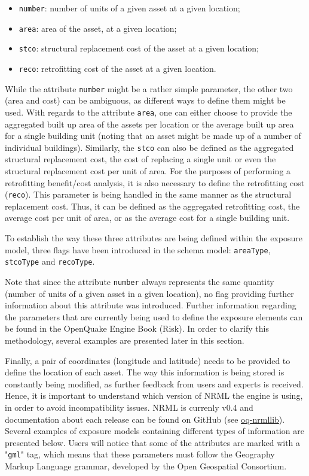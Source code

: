 \begin{itemize}
\item  \Verb+number+: number of units of a given \gls{asset} at a given location;
\item  \Verb+area+: area of the \gls{asset}, at a given location;
\item  \Verb+stco+: structural replacement cost of the \gls{asset} at a given location; 
\item  \Verb+reco+: retrofitting cost of the \gls{asset} at a given location. 
\end{itemize}

While the attribute \Verb+number+ might be a rather simple parameter, the other two (area and cost) can be ambiguous, as different ways to define them might be used. With regards to the attribute \Verb+area+, one can either choose to provide the aggregated built up area of the \glspl{asset} per location or the average built up area for a single building unit (noting that an \gls{asset} might be made up of a number of individual buildings). Similarly, the \Verb+stco+ can also be defined as the aggregated structural replacement cost, the cost of replacing a single unit or even the structural replacement cost per unit of area. For the purposes of performing a retrofitting benefit/cost analysis, it is also necessary to define the retrofitting cost (\Verb+reco+). This parameter is being handled in the same manner as the structural replacement cost. Thus, it can be defined as the aggregated retrofitting cost, the average cost per unit of area, or as the average cost for a single building unit. 

To establish the way these three attributes are being defined within the \gls{exposure model}, three flags have been introduced in the schema model:  \Verb+areaType+, \Verb+stcoType+ and \Verb+recoType+.

Note that since the attribute \Verb+number+ always represents the same quantity (number of units of a given \gls{asset} in a given location), no flag providing further information about this attribute was introduced. Further information regarding the parameters that are currently being used to define the exposure elements can be found in the OpenQuake Engine Book (Risk). In order to clarify this methodology, several examples are presented later in this section.

Finally, a pair of coordinates (longitude and latitude) needs to be provided to define the location of each asset. The way this information is being stored is constantly being modified, as further feedback from users and experts is received. Hence, it is important to understand which version of NRML the engine is using, in order to avoid incompatibility issues. NRML is currenly v0.4 and documentation about each release can be found on GitHub (see \href{http://gitub.com/gem/oq-nrmllib}{oq-nrmllib}). Several examples of \glspl{exposure model} containing different types of information are presented below. Users will notice that some of the attributes are marked with a "\Verb+gml+" tag, which means that these parameters must follow the Geography Markup Language grammar, developed by the Open Geospatial Consortium.\

